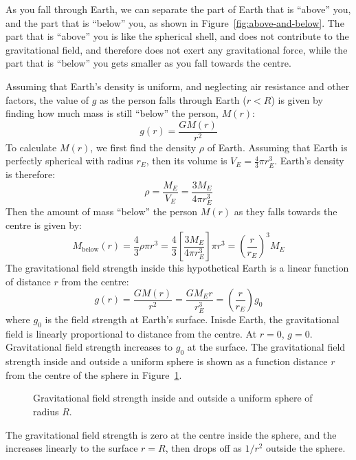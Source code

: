 As you fall through Earth, we can separate the part of Earth that is
``above'' you, and the part that is ``below'' you, as shown in
Figure~\ref{fig:above-and-below}. The part that is ``above'' you is like the
spherical shell, and does not contribute to the gravitational field, and
therefore does not exert any gravitational force, while the part that is
``below'' you gets smaller as you fall towards the centre.


Assuming that Earth's density is uniform, and neglecting air resistance and
other factors, the value of $g$ as the person falls through Earth ($r<R$) is
given by finding how much mass is still ``below'' the person, $M(r)$:
\begin{equation}
  g(r)=\frac{GM(r)}{r^2}
\end{equation}
To calculate $M(r)$, we first find the density $\rho$ of Earth. Assuming that
Earth is perfectly spherical with radius $r_E$, then its volume is
$V_E=\frac 43\pi r_E^3$. Earth's density is therefore:
\begin{equation}
  \rho=\frac{M_E}{V_E}=\frac{3M_E}{4\pi r_E^3}
\end{equation}
Then the amount of mass ``below'' the person $M(r)$ as they falls towards the
centre is given by:
\begin{equation}
  M_\text{below}(r)
  =\frac43\rho\pi r^3
  =\frac43\left[\frac{3M_E}{4\pi r_E^3}\right]\pi r^3
  = \left(\frac r{r_E} \right)^3M_E
\end{equation}
%
The gravitational field strength inside this hypothetical Earth is a
linear function of distance $r$ from the centre:
\begin{equation}
  g(r)=\frac{GM(r)}{r^2}=\frac{GM_Er}{r_E^3}=\left(\frac r{r_E}\right)g_0
\end{equation}
where $g_0$ is the field strength at Earth's surface. Inisde Earth, the
gravitational field is linearly proportional to distance from the centre. At
$r=0$, $g=0$. Gravitational field strength increases to $g_0$ at the surface.
The gravitational field strength inside and outside a uniform sphere is shown
as a function distance $r$ from the centre of the sphere in
Figure~\ref{fig:g-sphere}.
\begin{figure}[ht]
  \centering
  \caption{Gravitational field strength inside and outside a uniform sphere
    of radius $R$.}
  \label{fig:g-sphere}
\end{figure}
The gravitational field strength is zero at the centre inside the sphere, and
the increases linearly to the surface $r=R$, then drops off as $1/r^2$ outside
the sphere.

